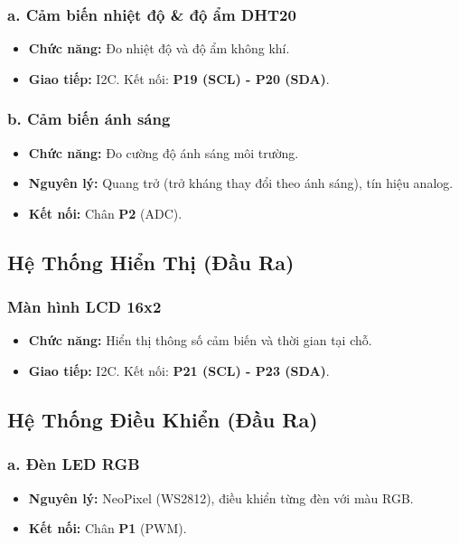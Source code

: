\subsubsection*{a. Cảm biến nhiệt độ \& độ ẩm DHT20}
\begin{itemize}
    \item \textbf{Chức năng:} Đo nhiệt độ và độ ẩm không khí.
    \item \textbf{Giao tiếp:} I2C. Kết nối: \textbf{P19 (SCL) - P20 (SDA)}.
\end{itemize}

\subsubsection*{b. Cảm biến ánh sáng}
\begin{itemize}
\item \textbf{Chức năng:} Đo cường độ ánh sáng môi trường.
    \item \textbf{Nguyên lý:} Quang trở (trở kháng thay đổi theo ánh sáng), tín hiệu analog.
    \item \textbf{Kết nối:} Chân \textbf{P2} (ADC).
\end{itemize}

\subsection{ Hệ Thống Hiển Thị (Đầu Ra)}

\subsubsection*{Màn hình LCD 16x2}
\begin{itemize}
    \item \textbf{Chức năng:} Hiển thị thông số cảm biến và thời gian tại chỗ.
    \item \textbf{Giao tiếp:} I2C. Kết nối: \textbf{P21 (SCL) - P23 (SDA)}.
\end{itemize}

\subsection{ Hệ Thống Điều Khiển (Đầu Ra)}

\subsubsection*{a. Đèn LED RGB}
\begin{itemize}
    \item \textbf{Nguyên lý:} NeoPixel (WS2812), điều khiển từng đèn với màu RGB.
    \item \textbf{Kết nối:} Chân \textbf{P1} (PWM).
\end{itemize}

